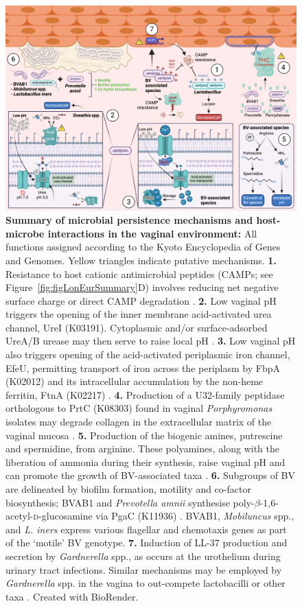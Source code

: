 \documentclass[sn-mathphys,Numbered]{sn-jnl}%
\begin{document}
\begin{figure}[h]
\centering
\includegraphics[scale=0.69]{0_multipanel_fig6.png}
\caption{\textbf{Summary of microbial persistence mechanisms and host-microbe interactions in the vaginal environment:} All functions assigned according to the Kyoto Encyclopedia of Genes and Genomes. Yellow triangles indicate putative mechanisms. \textbf{1.} Resistance to host cationic antimicrobial peptides (CAMPs; see Figure~\ref{fig:figLonEurSummary}D) involves reducing net negative surface charge or direct CAMP degradation \citep{neuhaus_continuum_2003}. \textbf{2.} Low vaginal pH triggers the opening of the inner membrane acid-activated urea channel, UreI (K03191). Cytoplasmic and/or surface-adsorbed UreA/B urease may then serve to raise local pH \citep{strugatsky_structure_2013}. \textbf{3.} Low vaginal pH also triggers opening of the acid-activated periplasmic iron channel, EfeU, permitting transport of iron across the periplasm by FbpA (K02012) and its intracellular accumulation by the non-heme ferritin, FtnA (K02217) \citep{chan_structural_2023}. \textbf{4.} Production of a U32-family peptidase orthologous to PrtC (K08303) found in vaginal \textit{Porphyromonas} isolates may degrade collagen in the extracellular matrix of the vaginal mucosa \citep{lithgow_collagenase_2022}. \textbf{5.} Production of the biogenic amines, putrescine and spermidine, from arginine. These polyamines, along with the liberation of ammonia during their synthesis, raise vaginal pH and can promote the growth of BV-associated taxa \citep{nelson_amines_2015}. \textbf{6.} Subgroups of BV are delineated by biofilm formation, motility and co-factor biosynthesis; BVAB1 and \textit{Prevotella amnii} synthesise poly-$\beta$-1,6-acetyl-\textsc{d}-glucosamine via PgaC (K11936) \citep{choi_pgaabcd_2009}. BVAB1, \textit{Mobiluncus} spp., and \textit{L. iners} express various flagellar \citep{armitage_assembly_2020} and chemotaxis \citep{miller_diversity_2009} genes as part of the `motile' BV genotype. \textbf{7.} Induction of LL-37 production and secretion by \textit{Gardnerella} spp., as occurs at the urothelium during urinary tract infections. Similar mechanisms may be employed by \textit{Gardnerella} spp. in the vagina to out-compete lactobacilli or other taxa \citep{Kiattiburut:2021}. Created with BioRender.}\label{fig:figMechSummary}
\end{figure}
\end{document}
